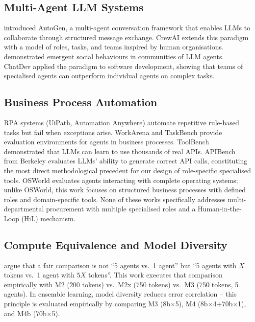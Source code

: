 \documentclass[preprint,12pt,authoryear]{elsarticle}
\begin{document}
\subsection{Multi-Agent LLM Systems}

\citet{wu2023autogen} introduced AutoGen, a multi-agent conversation framework
that enables LLMs to collaborate through structured message exchange.
CrewAI \citep{crewai2024} extends this paradigm with a model of roles, tasks,
and teams inspired by human organisations.
\citet{park2023generative} demonstrated emergent social behaviours in
communities of LLM agents.
ChatDev \citep{qian2023chatdev} applied the paradigm to software development,
showing that teams of specialised agents can outperform individual agents on
complex tasks.

\subsection{Business Process Automation}

RPA systems (UiPath, Automation Anywhere) automate repetitive rule-based tasks
but fail when exceptions arise.
WorkArena \citep{drouin2024workarena} and TaskBench \citep{lu2023taskbench}
provide evaluation environments for agents in business processes.
ToolBench \citep{qin2023toolllm} demonstrated that LLMs can learn to use
thousands of real APIs.
APIBench \citep{patil2023gorilla} from Berkeley evaluates LLMs' ability to
generate correct API calls, constituting the most direct methodological
precedent for our design of role-specific specialised tools.
OSWorld \citep{xie2024osworld} evaluates agents interacting with complete
operating systems; unlike OSWorld, this work focuses on structured business
processes with defined roles and domain-specific tools.
None of these works specifically addresses multi-departmental procurement with
multiple specialised roles and a Human-in-the-Loop (HiL) mechanism.

\subsection{Compute Equivalence and Model Diversity}

\citet{wu2023autogen} argue that a fair comparison is not ``5 agents vs.\
1 agent'' but ``5 agents with $X$ tokens vs.\ 1 agent with $5X$ tokens''.
This work executes that comparison empirically with M2 (200 tokens) vs.\
M2x (750 tokens) vs.\ M3 (750 tokens, 5 agents).
In ensemble learning, model diversity reduces error correlation
\citep{dietterich2000ensemble} -- this principle is evaluated empirically by
comparing M3 (8b$\times$5), M4 (8b$\times$4+70b$\times$1), and M4b
(70b$\times$5).
\end{document}
